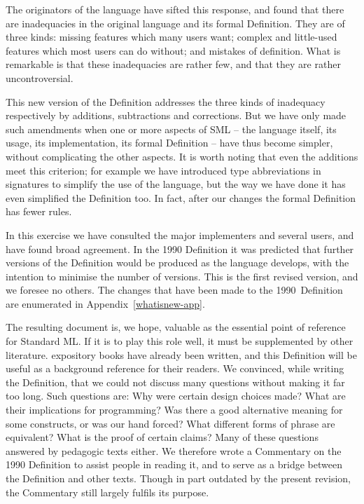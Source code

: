 The originators of the language have sifted this response, and
found that there are inadequacies in the original language and its
formal Definition.  They are of three kinds: missing features which
many users want;  complex and little-used features which most
users can do without; and mistakes of definition.  What is
remarkable is that these inadequacies are rather few, and that they
are rather uncontroversial.

This new version of the Definition addresses the three kinds
of inadequacy respectively by additions, subtractions and corrections.
But we have only made such amendments when one or more aspects of
SML -- the language itself, its usage, its implementation, its formal
Definition -- have thus become simpler, without complicating the
other aspects.  It is worth noting that even the additions meet this
criterion; for example we have introduced type abbreviations
in signatures to simplify the use of the language, but the way we
have done it has even simplified the Definition too.   In fact,
after our changes the formal Definition has fewer rules.

In this exercise we have consulted the major implementers and several
users, and have found broad agreement.  In the 1990 Definition it was
predicted that further versions of the Definition would be produced as
the language develops, with the intention to minimise the number of
versions.  This is the first revised version, and we foresee no
others. The changes that have been made to the 1990~Definition are
enumerated in Appendix~\ref{whatisnew-app}.

The resulting document is, we hope, valuable as the essential point of
reference for Standard ML.  If it is to play this role well, it must
be supplemented by other literature.  
expository books have already been
written, and this Definition will be useful as a
background reference for their readers.
We 
convinced, while
writing the  Definition, that we could
not discuss many questions without
making it far too long.  Such questions are: Why were certain design choices
made?  What are their implications for programming?
Was there a good alternative meaning for some constructs, or was our
hand forced?  What different forms of phrase are equivalent? What is the proof
of certain claims?  Many of these
questions 
answered by pedagogic texts either.
{We therefore wrote a
Commentary on the 1990
Definition to
assist people in reading it, and to
serve as a bridge between the Definition and other texts. Though in
part outdated by the present revision, the Commentary still largely fulfils its
purpose.}

